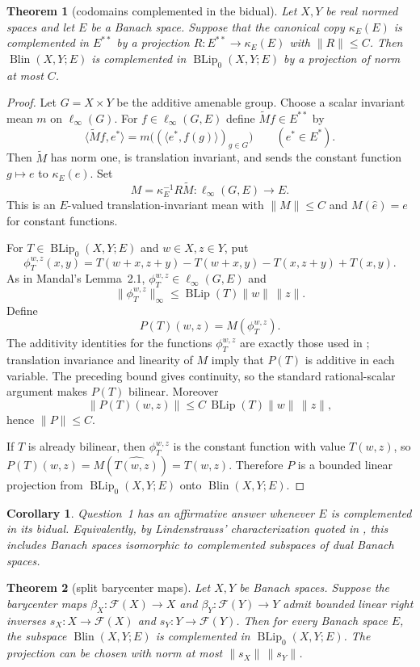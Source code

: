 \documentclass[11pt]{article}
\newtheorem{theorem}{Theorem}
\newtheorem{corollary}{Corollary}
\newcommand{\BLip}{\operatorname{BLip}}
\newcommand{\Blin}{\operatorname{Blin}}
\newcommand{\F}{\mathcal F}
\begin{document}
\begin{theorem}[codomains complemented in the bidual]
Let $X,Y$ be real normed spaces and let $E$ be a Banach space. Suppose that the
canonical copy $\kappa_E(E)$ is complemented in $E^{**}$ by a projection
$R:E^{**}\to \kappa_E(E)$ with $\|R\|\leq C$. Then
$\Blin(X,Y;E)$ is complemented in $\BLip_0(X,Y;E)$ by a projection of norm at
most $C$.
\end{theorem}

\begin{proof}
Let $G=X\times Y$ be the additive amenable group. Choose a scalar invariant
mean $m$ on $\ell_\infty(G)$. For $f\in \ell_\infty(G,E)$ define
$\widetilde M f\in E^{**}$ by
\[
\langle \widetilde M f,e^*\rangle
 = m\bigl((\langle e^*,f(g)\rangle)_{g\in G}\bigr)
 \qquad(e^*\in E^*).
\]
Then $\widetilde M$ has norm one, is translation invariant, and sends the
constant function $g\mapsto e$ to $\kappa_E(e)$. Set
\[
M=\kappa_E^{-1}R\widetilde M:\ell_\infty(G,E)\longrightarrow E.
\]
This is an $E$-valued translation-invariant mean with $\|M\|\leq C$ and
$M(\widehat e)=e$ for constant functions.

For $T\in\BLip_0(X,Y;E)$ and $w\in X,z\in Y$, put
\[
\phi_T^{w,z}(x,y)=T(w+x,z+y)-T(w+x,y)-T(x,z+y)+T(x,y).
\]
As in Mandal's Lemma~2.1, $\phi_T^{w,z}\in\ell_\infty(G,E)$ and
\[
\|\phi_T^{w,z}\|_\infty\leq \BLip(T)\|w\|\,\|z\|.
\]
Define
\[
P(T)(w,z)=M(\phi_T^{w,z}).
\]
The additivity identities for the functions $\phi_T^{w,z}$ are exactly those
used in \cite[Theorem~2.3]{mandal}; translation invariance and linearity of
$M$ imply that $P(T)$ is additive in each variable. The preceding bound gives
continuity, so the standard rational-scalar argument makes $P(T)$ bilinear.
Moreover
\[
\|P(T)(w,z)\|\leq C\,\BLip(T)\|w\|\,\|z\|,
\]
hence $\|P\|\leq C$.

If $T$ is already bilinear, then
$\phi_T^{w,z}$ is the constant function with value $T(w,z)$, so
$P(T)(w,z)=M(\widehat{T(w,z)})=T(w,z)$. Therefore $P$ is a bounded linear
projection from $\BLip_0(X,Y;E)$ onto $\Blin(X,Y;E)$.
\end{proof}

\begin{corollary}
Question~1 has an affirmative answer whenever $E$ is complemented in its
bidual. Equivalently, by Lindenstrauss' characterization quoted in
\cite{kania}, this includes Banach spaces isomorphic to complemented subspaces
of dual Banach spaces.
\end{corollary}

\begin{theorem}[split barycenter maps]
Let $X,Y$ be Banach spaces. Suppose the barycenter maps
$\beta_X:\F(X)\to X$ and $\beta_Y:\F(Y)\to Y$ admit bounded linear right
inverses $s_X:X\to\F(X)$ and $s_Y:Y\to\F(Y)$. Then for every Banach space
$E$, the subspace $\Blin(X,Y;E)$ is complemented in $\BLip_0(X,Y;E)$. The
projection can be chosen with norm at most $\|s_X\|\,\|s_Y\|$.
\end{theorem}
\end{document}

